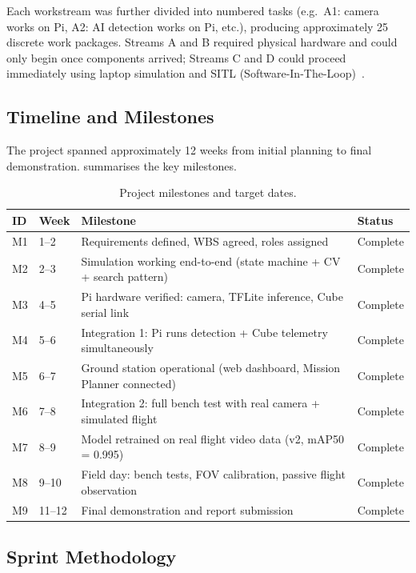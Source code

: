 Each workstream was further divided into numbered tasks (e.g.\ A1: camera works on Pi, A2: AI detection works on Pi, etc.), producing approximately 25 discrete work packages. Streams A and B required physical hardware and could only begin once components arrived; Streams C and D could proceed immediately using laptop simulation and SITL (Software-In-The-Loop)~\cite{ardupilot2024}.

\subsection{Timeline and Milestones}

The project spanned approximately 12 weeks from initial planning to final demonstration.  summarises the key milestones.

\begin{table}[htbp]
\centering
\compactTable
\caption{Project milestones and target dates.}
\label{tab:milestones}
\begin{tabularx}{\linewidth}{l l X l}
\toprule
\textbf{ID} & \textbf{Week} & \textbf{Milestone} & \textbf{Status} \\
\midrule
M1 & 1--2 & Requirements defined, WBS agreed, roles assigned & Complete \\
M2 & 2--3 & Simulation working end-to-end (state machine + CV + search pattern) & Complete \\
M3 & 4--5 & Pi hardware verified: camera, TFLite inference, Cube serial link & Complete \\
M4 & 5--6 & Integration 1: Pi runs detection + Cube telemetry simultaneously & Complete \\
M5 & 6--7 & Ground station operational (web dashboard, Mission Planner connected) & Complete \\
M6 & 7--8 & Integration 2: full bench test with real camera + simulated flight & Complete \\
M7 & 8--9 & Model retrained on real flight video data (v2, mAP50 = 0.995) & Complete \\
M8 & 9--10 & Field day: bench tests, FOV calibration, passive flight observation & Complete \\
M9 & 11--12 & Final demonstration and report submission & Complete \\
\bottomrule
\end{tabularx}
\end{table}

\subsection{Sprint Methodology}


